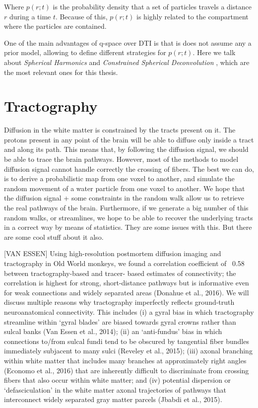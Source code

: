 Where $p(r;t)$  is the probability density that a set of particles travels a distance $r$ during a time $t$.
Because of this, $p(r;t)$ is highly related to the compartment where the particles are contained.

One of the main advantages of q-space over DTI is that is does not assume any a prior model, allowing to define different strategies for $p(r;t)$.
Here we talk about \textit{Spherical Harmonics} \cite{Tuch2004} and
\textit{Constrained Spherical Deconvolution} \cite{Tournier2004}, which are the most relevant ones for this thesis.

\section{Tractography}


Diffusion in the white matter is constrained by the tracts present on it.
The protons present in any point of the brain will be able to diffuse only inside a tract and along its path.
This means that, by following the diffusion signal, we should be able to trace the brain pathways.
However, most of the methods to model diffusion signal cannot handle correctly the crossing of fibers.
The best we can do, is to derive a probabilistic map from one voxel to another, and simulate the random movement of a water particle from one voxel to another.
We hope that the diffusion signal + some constraints in the random walk allow us to retrieve the real pathways of the brain.
Furthermore, if we generate a big number of this random walks, or streamlines, we hope to be able to recover the underlying tracts in a correct way by means of statistics.
They are some issues with this.
But there are some cool stuff about it also.

[VAN ESSEN]
Using high-resolution postmortem diffusion imaging and tractography in Old World monkeys, we found a correlation coefficient of ~0.58 between tractography-based and tracer- based estimates of connectivity;
the correlation is highest for strong, short-distance pathways but is informative even for weak connections and widely separated areas (Donahue et al., 2016).
We will discuss multiple reasons why tractography imperfectly reflects ground-truth neuroanatomical connectivity.
This includes
(i) a gyral bias in which tractography streamline within ‘gyral blades’ are biased towards gyral crowns rather than sulcal banks (Van Essen et al., 2014);
(ii) an ‘anti-fundus’ bias in which connections to/from sulcal fundi tend to be obscured by tangential fiber bundles immediately subjacent to many sulci (Reveley et al., 2015);
(iii) axonal branching within white matter that includes many branches at approximately right angles (Economo et al., 2016) that are inherently difficult to discriminate from crossing fibers that also occur within white matter;
and (iv) potential dispersion or ‘defasciculation’ in the white matter axonal trajectories of pathways that interconnect widely separated gray matter parcels (Jbabdi et al., 2015).


